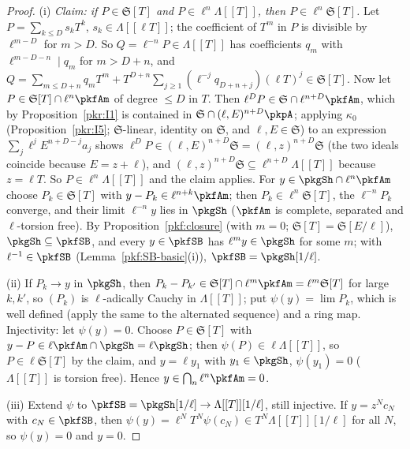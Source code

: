 \documentclass[10pt]{amsart}
\theoremstyle{definition}
\theoremstyle{remark}
\begin{document}
\begin{proof}
(i) \emph{Claim: if $P\in\mathfrak S[T]$ and $P\in\ell^n\Lambda[[T]]$, then $P\in\ell^n\mathfrak S[T]$.}
Let $P=\sum_{k\le D}s_kT^k$, $s_k\in\Lambda[[\ell T]]$; the coefficient of $T^m$ in $P$ is divisible by
$\ell^{m-D}$ for $m>D$. So $Q=\ell^{-n}P\in\Lambda[[T]]$ has coefficients $q_m$ with $\ell^{m-D-n}\mid q_m$ for
$m>D+n$, and $Q=\sum_{m\le D+n}q_mT^m+T^{D+n}\sum_{j\ge1}(\ell^{-j}q_{D+n+j})(\ell T)^j\in\mathfrak S[T]$.
Now let $P\in\mathfrak S[T]\cap\ell^n\pkfAm$ of degree $\le D$ in $T$. Then $\ell^DP\in\mathfrak S\cap
\ell^{n+D}\pkfAm$, which by Proposition~\ref{pkr:I1} is contained in $\mathfrak S\cap(\ell,E)^{n+D}\pkpA$;
applying $\kappa_0$ (Proposition~\ref{pkr:I5}; $\mathfrak S$-linear, identity on $\mathfrak S$, and
$\ell,E\in\mathfrak S$) to an expression $\sum_j\ell^jE^{n+D-j}a_j$ shows $\ell^DP\in(\ell,E)^{n+D}\mathfrak S=
(\ell,z)^{n+D}\mathfrak S$ (the two ideals coincide because $E=z+\ell$), and $(\ell,z)^{n+D}\mathfrak S
\subseteq\ell^{n+D}\Lambda[[T]]$ because $z=\ell T$. So $P\in\ell^n\Lambda[[T]]$ and the claim applies. For
$y\in\pkgSh\cap\ell^n\pkfAm$ choose $P_k\in\mathfrak S[T]$ with $y-P_k\in\ell^{n+k}\pkfAm$; then
$P_k\in\ell^n\mathfrak S[T]$, the $\ell^{-n}P_k$ converge, and their limit $\ell^{-n}y$ lies in $\pkgSh$
($\pkfAm$ is complete, separated and $\ell$-torsion free). By Proposition~\ref{pkf:closure} (with $m=0$;
$\mathfrak S[T]=\mathfrak S[E/\ell]$), $\pkgSh\subseteq\pkfSB$, and every $y\in\pkfSB$ has $\ell^my\in\pkgSh$
for some $m$; with $\ell^{-1}\in\pkfSB$ (Lemma~\ref{pkf:SB-basic}(i)), $\pkfSB=\pkgSh[1/\ell]$.

(ii) If $P_k\to y$ in $\pkgSh$, then $P_k-P_{k'}\in\mathfrak S[T]\cap\ell^m\pkfAm=\ell^m\mathfrak S[T]$ for
large $k,k'$, so $(P_k)$ is $\ell$-adically Cauchy in $\Lambda[[T]]$; put $\psi(y)=\lim P_k$, which is well
defined (apply the same to the alternated sequence) and a ring map. Injectivity: let $\psi(y)=0$. Choose
$P\in\mathfrak S[T]$ with $y-P\in\ell\pkfAm\cap\pkgSh=\ell\pkgSh$; then $\psi(P)\in\ell\Lambda[[T]]$, so
$P\in\ell\mathfrak S[T]$ by the claim, and $y=\ell y_1$ with $y_1\in\pkgSh$, $\psi(y_1)=0$ ($\Lambda[[T]]$ is
torsion free). Hence $y\in\bigcap_n\ell^n\pkfAm=0$.

(iii) Extend $\psi$ to $\pkfSB=\pkgSh[1/\ell]\to\Lambda[[T]][1/\ell]$, still injective. If $y=z^Nc_N$
with $c_N\in\pkfSB$, then $\psi(y)=\ell^NT^N\psi(c_N)\in T^N\Lambda[[T]][1/\ell]$ for all $N$, so $\psi(y)=0$
and $y=0$.
\end{proof}
\end{document}
